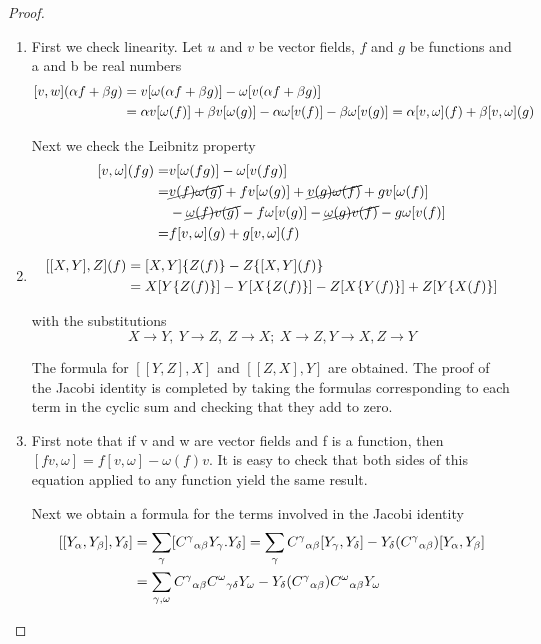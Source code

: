 \begin{proof}
\begin{enumerate}[label=(\alph*)]
    \item First we check linearity. Let $u$ and $v$ be vector fields, $f$ and $g$ be functions and a and b be real numbers
    \[\begin{aligned}\relax
        [v,w](\alpha f+\beta g)&=v[\omega(\alpha f+\beta g)]-\omega[v(\alpha f+\beta g)]\\
        &=\alpha v[\omega(f)]+\beta v[\omega(g)]-\alpha\omega[v(f)]-\beta\omega[v(g)]=\alpha[v,\omega](f)+\beta[v,\omega](g)
    \end{aligned}\]

    Next we check the Leibnitz property
    \[\begin{aligned}\relax
        [v,\omega](fg)=&v[\omega(fg)]-\omega[v(fg)]\\
        =&\cancel{v(f)\omega(g)}+fv[\omega(g)]+\cancel{v(g)\omega(f)}+gv[\omega(f)]\\
        &-\cancel{\omega(f)v(g)}-f\omega[v(g)]-\cancel{\omega(g)v(f)}-g\omega[v(f)]\\
        =&f[v,\omega](g)+g[v,\omega](f)
    \end{aligned}
    \]
    \item \[\begin{aligned}\relax
        [[X,Y],Z](f)&=[X,Y]\{Z(f)\}-Z\{[X,Y](f)\}\\
        &=X[Y\{Z(f)\}]-Y[X\{Z(f)\}]-Z[X\{Y(f)\}]+Z[Y\{X(f)\}]
    \end{aligned}\]

    with the substitutions 
    \[X\to Y,\ Y\to Z,\ Z\to X;\ X\to Z, Y\to X, Z\to Y\]

    The formula for $[[Y,Z],X]$ and $[[Z, X], Y]$ are obtained. The proof of the Jacobi identity is completed by taking the formulas corresponding to each term in the cyclic sum and checking that they add to zero.
    \item First note that if v and w are vector fields and f is a function, then $[fv,\omega]=f[v,\omega]-\omega(f)v$. It is easy to check that both sides of this equation
    applied to any function yield the same result.
    
    Next we obtain a formula for the terms involved in the Jacobi identity
    \[\begin{aligned}\relax
        [[Y_\alpha,Y_\beta],Y_\delta]&=\sum_\gamma[{C^\gamma}_{\alpha\beta}Y_\gamma.Y_\delta]=\sum_\gamma {C^\gamma}_{\alpha\beta}[Y_\gamma,Y_\delta]-Y_\delta({C^\gamma}_{\alpha\beta})[Y_\alpha,Y_\beta]\\
        &=\sum_{\gamma,\omega}{C^\gamma}_{\alpha\beta}{C^\omega}_{\gamma\delta}Y_\omega-Y_\delta({C^\gamma}_{\alpha\beta}){C^\omega}_{\alpha\beta}Y_\omega
    \end{aligned}\]


\end{enumerate}
\end{proof}
